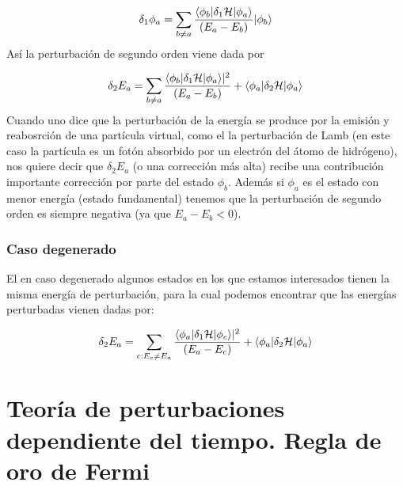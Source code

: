 \begin{eqnarray}
	\delta_1 \phi_a = \sum_{b\neq a} \frac{\langle \phi_b | \delta_1 \mathcal{H} |\phi_a\rangle}{(E_a-E_b)} |\phi_b\rangle
\end{eqnarray}
Así la perturbación de segundo orden viene dada por


\begin{eqnarray}
	\delta_2 E_a = \sum_{b\neq a} \frac{\langle \phi_b | \delta_1 \mathcal{H} |\phi_a \rangle |^2}{(E_a - E_b)} + \langle \phi_a |\delta_2 \mathcal{H} |\phi_a \rangle
\end{eqnarray}
Cuando uno dice que la perturbación de la energía se produce por la emisión y reabosrción de una partícula virtual, como el la perturbación de Lamb (en este caso la partícula es un fotón absorbido por un electrón del átomo de hidrógeno), nos quiere decir que $\delta_2 E_a$ (o una corrección más alta) recibe una contribución importante corrección por parte del estado $\phi_b$. Además si $\phi_a$ es el estado con menor energía (estado fundamental) tenemos que la perturbación de segundo orden es siempre negativa (ya que $E_a-E_b<0$).


\subsubsection{Caso degenerado}

El en caso degenerado algunos estados en los que estamos interesados tienen la misma energía de perturbación, para la cual podemos encontrar que las energías perturbadas vienen dadas por:

\begin{eqnarray}
	\delta_2 E_a = \sum_{c:E_c\neq E_a} \frac{\langle \phi_a|\delta_1 \mathcal{H} |\phi_c\rangle |^2}{(E_a-E_c)} + \langle \phi_a |\delta_2 \mathcal{H} |\phi_a \rangle
\end{eqnarray}

\section[Regla de Oro de Fermi]{Teoría de perturbaciones dependiente del tiempo. Regla de oro de Fermi}

